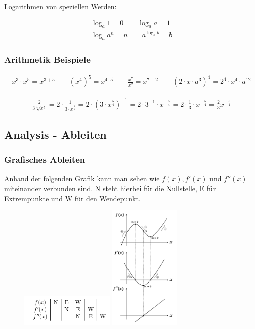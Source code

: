 \documentclass[a4paper]{article}
\begin{document}
Logarithmen von speziellen Werden:

\begin{align*}
	\log_a 1 = 0 \qquad \log_a a = 1\\
	\log_a a^n = n \qquad a^{\log_a b} = b
\end{align*}

\subsubsection*{Arithmetik Beispiele}

\begin{align*}
	x^3 \cdot x^5 = x^{3 + 5} \qquad 
	(x^4)^5 = x^{4 \cdot 5} \qquad 
	\frac{x^7}{x^2} = x^{7 - 2}	\qquad
	(2 \cdot x \cdot a^3)^4 = 2^4 \cdot x^4 \cdot a^{12}
\end{align*}

\begin{align*}
	\frac{2}{3 \sqrt[4]{x^5}} = 2 \cdot \frac{1}{3 \cdot x^\frac{5}{4}} = 2 \cdot (3 \cdot x^\frac{5}{4})^{-1} = 2 \cdot 3^{-1} \cdot x^{- \frac{5}{4}} = 2 \cdot \frac{1}{3} \cdot x^{-\frac{5}{4}} = \frac{2}{3}x^{-\frac{5}{4}}
\end{align*}


\subsection*{Analysis - Ableiten}


\subsubsection*{Grafisches Ableiten}

Anhand der folgenden Grafik kann man sehen wie $f(x), f'(x)$ und $f''(x)$ miteinander verbunden sind. N steht hierbei für die Nullstelle, E für Extrempunkte und W für den Wendepunkt.

\begin{figure}[ht]
  \includegraphics[width=0.4\textwidth]{images/grafisch_ableiten_tabelle.PNG}
  \includegraphics[width=0.3\textwidth]{images/grafisch_ableiten.PNG}
\end{figure}	
\end{document}
